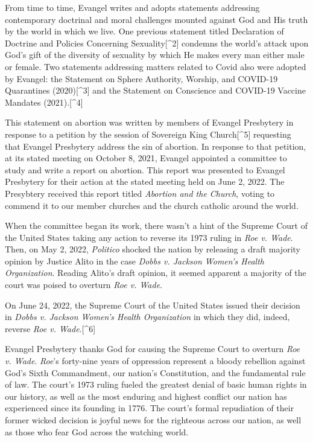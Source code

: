 \documentclass[
]{book}
\begin{document}
From time to time, Evangel writes and adopts statements addressing contemporary doctrinal and moral challenges mounted against God and His truth by the world in which we live. One previous statement titled Declaration of Doctrine and Policies Concerning Sexuality{[}\^{}2{]} condemns the world's attack upon God's gift of the diversity of sexuality by which He makes every man either male or female. Two statements addressing matters related to Covid also were adopted by Evangel: the Statement on Sphere Authority, Worship, and COVID-19 Quarantines (2020){[}\^{}3{]} and the Statement on Conscience and COVID-19 Vaccine Mandates (2021).{[}\^{}4{]}

This statement on abortion was written by members of Evangel Presbytery in response to a petition by the session of Sovereign King Church{[}\^{}5{]} requesting that Evangel Presbytery address the sin of abortion. In response to that petition, at its stated meeting on October 8, 2021, Evangel appointed a committee to study and write a report on abortion. This report was presented to Evangel Presbytery for their action at the stated meeting held on June 2, 2022. The Presybtery received this report titled \emph{Abortion and the Church}, voting to commend it to our member churches and the church catholic around the world.

When the committee began its work, there wasn't a hint of the Supreme Court of the United States taking any action to reverse its 1973 ruling in \emph{Roe v. Wade}. Then, on May 2, 2022, \emph{Politico} shocked the nation by releasing a draft majority opinion by Justice Alito in the case \emph{Dobbs v. Jackson Women's Health Organization}. Reading Alito's draft opinion, it seemed apparent a majority of the court was poised to overturn \emph{Roe v. Wade}.

On June 24, 2022, the Supreme Court of the United States issued their decision in \emph{Dobbs v. Jackson Women's Health Organization} in which they did, indeed, reverse \emph{Roe v. Wade}.{[}\^{}6{]}

Evangel Presbytery thanks God for causing the Supreme Court to overturn \emph{Roe v. Wade}. \emph{Roe}'s forty-nine years of oppression represent a bloody rebellion against God's Sixth Commandment, our nation's Constitution, and the fundamental rule of law. The court's 1973 ruling fueled the greatest denial of basic human rights in our history, as well as the most enduring and highest conflict our nation has experienced since its founding in 1776. The court's formal repudiation of their former wicked decision is joyful news for the righteous across our nation, as well as those who fear God across the watching world.
\end{document}
